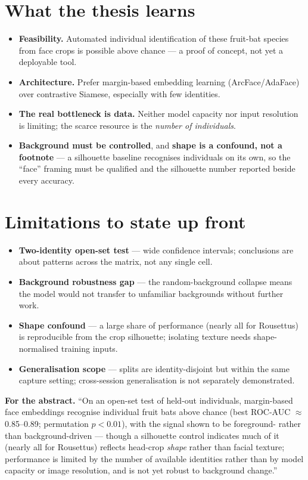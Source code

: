 \documentclass[11pt]{article}
\begin{document}
\section{What the thesis learns}
\begin{itemize}
\item \textbf{Feasibility.} Automated individual identification of these fruit-bat species from face
crops is possible above chance --- a proof of concept, not yet a deployable tool.
\item \textbf{Architecture.} Prefer margin-based embedding learning (ArcFace/AdaFace) over contrastive
Siamese, especially with few identities.
\item \textbf{The real bottleneck is data.} Neither model capacity nor input resolution is limiting;
the scarce resource is the \emph{number of individuals}.
\item \textbf{Background must be controlled}, and \textbf{shape is a confound, not a footnote} --- a
silhouette baseline recognises individuals on its own, so the ``face'' framing must be qualified and
the silhouette number reported beside every accuracy.
\end{itemize}

\section{Limitations to state up front}
\begin{itemize}
\item \textbf{Two-identity open-set test} --- wide confidence intervals; conclusions are about
patterns across the matrix, not any single cell.
\item \textbf{Background robustness gap} --- the random-background collapse means the model would not
transfer to unfamiliar backgrounds without further work.
\item \textbf{Shape confound} --- a large share of performance (nearly all for Rousettus) is
reproducible from the crop silhouette; isolating texture needs shape-normalised training inputs.
\item \textbf{Generalisation scope} --- splits are identity-disjoint but within the same capture
setting; cross-session generalisation is not separately demonstrated.
\end{itemize}

\begin{callout}[good]
\textbf{For the abstract.} ``On an open-set test of held-out individuals, margin-based face embeddings
recognise individual fruit bats above chance (best ROC-AUC $\approx$ 0.85--0.89; permutation
$p<0.01$), with the signal shown to be foreground- rather than background-driven --- though a
silhouette control indicates much of it (nearly all for Rousettus) reflects head-crop \emph{shape}
rather than facial texture; performance is limited by the number of available identities rather than
by model capacity or image resolution, and is not yet robust to background change.''
\end{callout}
\end{document}
